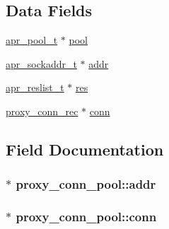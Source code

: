 \subsection*{Data Fields}
\begin{DoxyCompactItemize}
\item 
\hyperlink{structapr__pool__t}{apr\+\_\+pool\+\_\+t} $\ast$ \hyperlink{structproxy__conn__pool_aa683a756f120a4482de8289705ff5faa}{pool}
\item 
\hyperlink{structapr__sockaddr__t}{apr\+\_\+sockaddr\+\_\+t} $\ast$ \hyperlink{structproxy__conn__pool_ace4435ae1625464d94beb6c4d6de7c2b}{addr}
\item 
\hyperlink{structapr__reslist__t}{apr\+\_\+reslist\+\_\+t} $\ast$ \hyperlink{structproxy__conn__pool_ae3659e08b0bf0f25be12f5e71a676c1d}{res}
\item 
\hyperlink{structproxy__conn__rec}{proxy\+\_\+conn\+\_\+rec} $\ast$ \hyperlink{structproxy__conn__pool_a71cc4cd74a5bc62fe14529caef1c318a}{conn}
\end{DoxyCompactItemize}


\subsection{Field Documentation}
\subsubsection[{\texorpdfstring{addr}{addr}}]{$\ast$ proxy\+\_\+conn\+\_\+pool\+::addr}\hypertarget{structproxy__conn__pool_ace4435ae1625464d94beb6c4d6de7c2b}{}\label{structproxy__conn__pool_ace4435ae1625464d94beb6c4d6de7c2b}
\subsubsection[{\texorpdfstring{conn}{conn}}]{$\ast$ proxy\+\_\+conn\+\_\+pool\+::conn}\hypertarget{structproxy__conn__pool_a71cc4cd74a5bc62fe14529caef1c318a}{}\label{structproxy__conn__pool_a71cc4cd74a5bc62fe14529caef1c318a}
